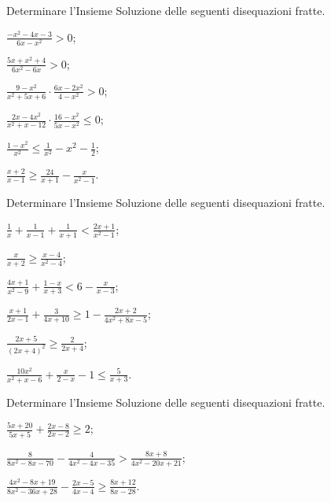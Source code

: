 \begin{esercizio}[\Ast]
 \label{ese:4.65}
Determinare l'Insieme Soluzione delle seguenti disequazioni fratte.
\begin{multicols}{2}
\begin{enumeratea}
\item $\frac{-x^2-4x-3}{6x-x^2}>0$;
\item $\frac{5x+x^2+4}{6x^2-6x}>0$;
\item $\frac{9-x^2}{x^2+5x+6}\cdot \frac{6x-2x^2}{4-x^2}>0$;
\item $\frac{2x-4x^2}{x^2+x-12}\cdot \frac{16-x^2}{5x-x^2}\le 0$;
\item $\frac{1-x^2}{x^2}\le \frac 1{x^2}-x^2-\frac 1 2$;
\item $\frac{x+2}{x-1}\ge \frac{24}{x+1}-\frac x{x^2-1}$.
\end{enumeratea}
\end{multicols}
\end{esercizio}

\begin{esercizio}[\Ast]
 \label{ese:4.66}
Determinare l'Insieme Soluzione delle seguenti disequazioni fratte.
\begin{multicols}{2}
\begin{enumeratea}
\item $\frac 1 x+\frac 1{x-1}+\frac 1{x+1}<\frac{2x+1}{x^2-1}$;
\item $\frac x{x+2}\ge \frac{x-4}{x^2-4}$;
\item $\frac{4x+1}{x^2-9}+\frac{1-x}{x+3}<6-\frac x{x-3}$;
\item $\frac{x+1}{2x-1}+\frac 3{4x+10}\ge 1-\frac{2x+2}{4x^2+8x-5}$;
\item $\frac{2x+5}{(2x+4)^2}\ge \frac 2{2x+4}$;
\item $\frac{10x^2}{x^2+x-6}+\frac x{2-x}-1\le \frac 5{x+3}$.
\end{enumeratea}
\end{multicols}
\end{esercizio}

\begin{esercizio}[\Ast]
 \label{ese:4.67}
Determinare l'Insieme Soluzione delle seguenti disequazioni fratte.
\begin{multicols}{2}
\begin{enumeratea}
\item $\frac{5x+20}{5x+5}+\frac{2x-8}{2x-2}\ge 2$;
\item $\frac 8{8x^2-8x-70}-\frac 4{4x^2-4x-35}>\frac{8x+8}{4x^2-20x+21}$;
\item $\frac{4x^2-8x+19}{8x^2-36x+28}-\frac{2x-5}{4x-4}\ge \frac{8x+12}{8x-28}$.
\end{enumeratea}
\end{multicols}
\end{esercizio}

